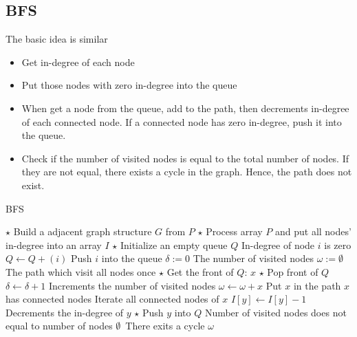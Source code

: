 \subsection{BFS}
The basic idea is similar
\begin{itemize}
    \item Get in-degree of each node
    \item Put those nodes with zero in-degree into the queue
    \item When get a node from the queue, add to the path, then decrements in-degree of each connected node. If a connected node has zero in-degree, push it into the queue.
    \item Check if the number of visited nodes is equal to the total number of nodes. If they are not equal, there exists a cycle in the graph. Hence, the path does not exist.
\end{itemize}
\begin{algorithm}[H]
\caption{BFS}
\begin{algorithmic}[1]
\State $\star$ Build a adjacent graph structure $G$ from $P$
\State $\star$ Process array $P$ and put all nodes' in-degree into an array $I$
\State $\star$ Initialize an empty queue $Q$
 \Comment In-degree of node $i$ is zero
\State $Q\gets Q + (i)$ \Comment Push $i$ into the queue
\EndIf
\EndFor
\State $\delta:=0$ \Comment The number of visited nodes
\State $\omega:=\emptyset$ \Comment The path which visit all nodes once
\State $\star$ Get the front of $Q$: $x$
\State $\star$ Pop front of $Q$
\State $\delta\gets\delta+1$ \Comment Increments the number of visited nodes
\State $\omega\gets\omega+x$ \Comment Put $x$ in the path
 \Comment $x$ has connected nodes
 \Comment Iterate all connected nodes of $x$
\State $I[y]\gets I[y]-1$ \Comment Decrements the in-degree of $y$
\State $\star$ Push $y$ into $Q$
\EndIf
\EndIf
\EndFor
\EndIf
\EndWhile
{} \Comment Number of visited nodes does not equal to number of nodes
\State \Return $\emptyset$\ \Comment There exits a cycle
\Else
\State \Return $\omega$
\EndIf
{}
\end{algorithmic}
\end{algorithm}
\begin{algorithm}[H]
\begin{algorithmic}[1]
\EndProcedure
\end{algorithmic}
\end{algorithm}

